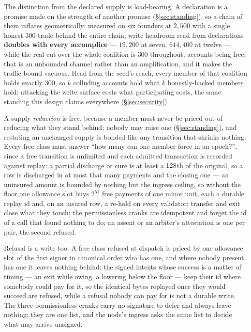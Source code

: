 The distinction from the declared supply is load-bearing. A declaration is a promise made
on the strength of another promise (\S\ref{sec:standing}), so a chain of them inflates
geometrically: measured on six founders at $2{,}500$ with a single honest $300$ trade
behind the entire chain, write headroom read from declarations \textbf{doubles with every
accomplice} --- $19{,}200$ at seven, $614{,}400$ at twelve --- while the real cut over the
whole coalition is $300$ throughout; accounts being free, that is an unbounded channel
rather than an amplification, and it makes the traffic bound vacuous. Read from the seed's
reach, every member of that coalition holds exactly $300$, so $k$ colluding accounts hold
what $k$ honestly-backed members hold: attacking the write surface costs what
participating costs, the same standing this design claims everywhere
(\S\ref{sec:security}).

A supply \emph{reduction} is free, because a member must never be priced out of reducing
what they stand behind; nobody may raise one (\S\ref{sec:standing}), and restating an
unchanged supply is bonded like any transition that shrinks nothing. Every free class must
answer ``how many can one member force in an epoch?'', since a free transition is
unlimited and each admitted transaction is recorded against replay: a partial discharge or
cure is at least a $128$th of the original, so a row is discharged in
at most that many payments and the closing one --- an uninsured amount is bounded by
nothing but the ingress ceiling, so without the floor one allowance slot buys $2^{51}$
free payments of one minor unit, each a durable replay id and, on an insured row, a
re-hold on every validator; transfer and exit close what they touch; the permissionless
cranks are idempotent and forget the id of a call that found nothing to do; an assent or
an arbiter's attestation is one per pair, the second refused.

Refusal is a write too. A free class refused at dispatch is priced by one allowance slot
of the first signer in canonical order who has one, and where nobody present has one it
leaves nothing behind: the signed intents whose success is a matter of timing --- an exit
while owing, a lowering below the floor --- keep their id where somebody could pay for it,
so the identical bytes replayed once they would succeed are refused, while a refusal
nobody can pay for is not a durable write. The three permissionless cranks carry no
signature to defer and always leave nothing; they are one list, and the node's ingress
asks the same list to decide what may arrive unsigned.

